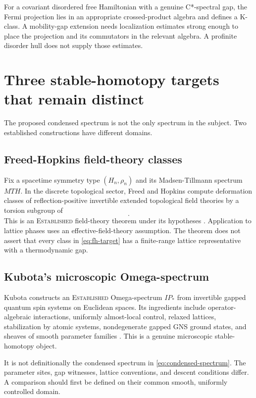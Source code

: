 \documentclass[12pt]{article}
\theoremstyle{definition}
\theoremstyle{remark}
\newcommand{\IP}{\mathit{IP}}
\newcommand{\EST}{\textnormal{\textsc{Established}}}
\begin{document}
For a covariant disordered free Hamiltonian with a genuine C*-spectral gap,
the Fermi projection lies in an appropriate crossed-product algebra and
defines a K-class.  A mobility-gap extension needs localization estimates
strong enough to place the projection and its commutators in the relevant
algebra.  A profinite disorder hull does not supply those estimates.

\section{Three stable-homotopy targets that remain distinct}

The proposed condensed spectrum is not the only spectrum in the subject.
Two established constructions have different domains.

\subsection{Freed-Hopkins field-theory classes}

Fix a spacetime symmetry type $(H_n,\rho_n)$ and its Madsen-Tillmann spectrum
$MTH$.  In the discrete topological sector, Freed and Hopkins compute
deformation classes of reflection-positive invertible extended topological
field theories by a torsion subgroup of
\begin{equation}
[MTH,\Sigma^{n+1}I\mathbb Z(1)].
\label{eq:fh-target}
\end{equation}
This is an \EST{} field-theory theorem under its hypotheses
\cite{FreedHopkins2021}.  Application to
lattice phases uses an effective-field-theory assumption.  The theorem does
not assert that every class in \cref{eq:fh-target} has a finite-range lattice
representative with a thermodynamic gap.

\subsection{Kubota's microscopic Omega-spectrum}

Kubota constructs an \EST{} Omega-spectrum $\IP_*$ from invertible gapped
quantum spin systems on Euclidean spaces.  Its ingredients include
operator-algebraic interactions, uniformly almost-local control, relaxed
lattices, stabilization by atomic systems, nondegenerate gapped GNS ground
states, and sheaves of smooth parameter families \cite{Kubota2025}.  This is a genuine
microscopic stable-homotopy object.

It is not definitionally the condensed spectrum in
\cref{eq:condensed-spectrum}.  The parameter sites, gap witnesses, lattice
conventions, and descent conditions differ.  A comparison should first be
defined on their common smooth, uniformly controlled domain.
\end{document}
